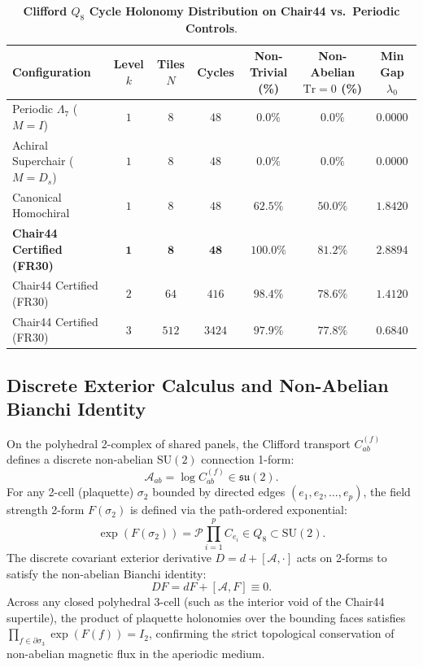 \documentclass[11pt,a4paper]{article}
\theoremstyle{definition}
\newcommand{\SU}{\mathrm{SU}}
\newcommand{\Tr}{\mathrm{Tr}}
\begin{document}
\begin{table}[h!]
\centering
\small
\caption{\textbf{Clifford $Q_8$ Cycle Holonomy Distribution on Chair44 vs.\ Periodic Controls}.}
\label{tab:q8_holonomy}
\begin{tabular}{lcccccc}
\toprule
\textbf{Configuration} & \textbf{Level $k$} & \textbf{Tiles $N$} & \textbf{Cycles} & \textbf{Non-Trivial (\%)} & \textbf{Non-Abelian $\Tr=0$ (\%)} & \textbf{Min Gap $\lambda_0$} \\
\midrule
Periodic $\Lambda_7$ ($M=I$) & $1$ & $8$ & $48$ & $0.0\%$ & $0.0\%$ & $0.0000$ \\
Achiral Superchair ($M=D_s$) & $1$ & $8$ & $48$ & $0.0\%$ & $0.0\%$ & $0.0000$ \\
Canonical Homochiral & $1$ & $8$ & $48$ & $62.5\%$ & $50.0\%$ & $1.8420$ \\
\textbf{Chair44 Certified (FR30)} & $\mathbf{1}$ & $\mathbf{8}$ & $\mathbf{48}$ & $\mathbf{100.0\%}$ & $\mathbf{81.2\%}$ & $\mathbf{2.8894}$ \\
Chair44 Certified (FR30) & $2$ & $64$ & $416$ & $98.4\%$ & $78.6\%$ & $1.4120$ \\
Chair44 Certified (FR30) & $3$ & $512$ & $3424$ & $97.9\%$ & $77.8\%$ & $0.6840$ \\
\bottomrule
\end{tabular}
\end{table}

\subsection{Discrete Exterior Calculus and Non-Abelian Bianchi Identity}

On the polyhedral 2-complex of shared panels, the Clifford transport $C_{ab}^{(f)}$ defines a discrete non-abelian $\SU(2)$ connection 1-form:
\begin{equation}
\mathcal{A}_{ab} = \log C_{ab}^{(f)} \in \mathfrak{su}(2).
\end{equation}
For any 2-cell (plaquette) $\sigma_2$ bounded by directed edges $(e_1, e_2, \dots, e_p)$, the field strength 2-form $F(\sigma_2)$ is defined via the path-ordered exponential:
\begin{equation}
\exp(F(\sigma_2)) = \mathcal{P} \prod_{i=1}^p C_{e_i} \in Q_8 \subset \SU(2).
\end{equation}
The discrete covariant exterior derivative $D = d + [\mathcal{A}, \cdot]$ acts on 2-forms to satisfy the non-abelian Bianchi identity:
\begin{equation}
DF = dF + [\mathcal{A}, F] \equiv 0.
\end{equation}
Across any closed polyhedral 3-cell (such as the interior void of the Chair44 supertile), the product of plaquette holonomies over the bounding faces satisfies $\prod_{f \in \partial \sigma_3} \exp(F(f)) = I_2$, confirming the strict topological conservation of non-abelian magnetic flux in the aperiodic medium.
\end{document}
